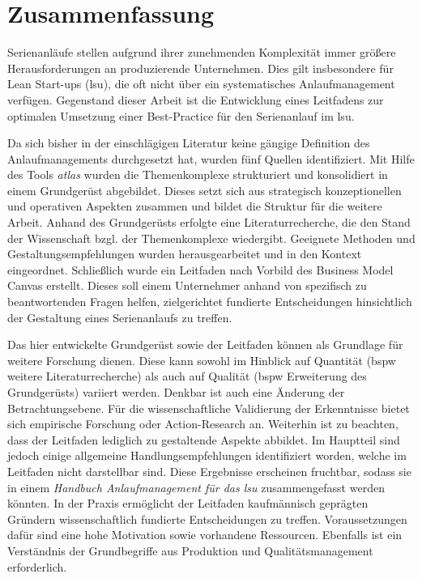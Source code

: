 \chapter*{Zusammenfassung}
Serienanläufe stellen aufgrund ihrer zunehmenden Komplexität immer größere Herausforderungen an produzierende Unternehmen. Dies gilt insbesondere für Lean Start-ups (\gls{lsu}), die oft nicht über ein systematisches Anlaufmanagement verfügen.
Gegenstand dieser Arbeit ist die Entwicklung eines Leitfadens zur optimalen Umsetzung einer Best-Practice für den Serienanlauf im \gls{lsu}.

Da sich bisher in der einschlägigen Literatur keine gängige Definition des Anlaufmanagements durchgesetzt hat, wurden fünf Quellen identifiziert. 
% 
Mit Hilfe des Tools \textit{\gls{atlas}} wurden die Themenkomplexe strukturiert und konsolidiert in einem Grundgerüst abgebildet. Dieses setzt sich aus strategisch konzeptionellen und operativen Aspekten zusammen und bildet die Struktur für die weitere Arbeit. 
Anhand des Grundgerüsts erfolgte eine Literaturrecherche, die den Stand der Wissenschaft bzgl. der Themenkomplexe wiedergibt. Geeignete Methoden und Gestaltungsempfehlungen wurden herausgearbeitet und in den Kontext eingeordnet. 
Schließlich wurde ein Leitfaden nach Vorbild des Business Model Canvas erstellt. Dieses soll einem Unternehmer anhand von spezifisch zu beantwortenden Fragen helfen, zielgerichtet fundierte Entscheidungen hinsichtlich der Gestaltung eines Serienanlaufs zu treffen. 
% 

Das hier entwickelte Grundgerüst sowie der Leitfaden können als Grundlage für weitere Forschung dienen. Diese kann sowohl im Hinblick auf Quantität (\gls{bspw} weitere Literaturrecherche) als auch auf Qualität (\gls{bspw} Erweiterung des Grundgerüsts) variiert werden. Denkbar ist auch eine Änderung der Betrachtungsebene. Für die wissenschaftliche Validierung der Erkenntnisse bietet sich empirische Forschung oder Action-Research an. 
Weiterhin ist zu beachten, dass der Leitfaden lediglich zu gestaltende Aspekte abbildet. Im Hauptteil sind jedoch einige allgemeine Handlungsempfehlungen identifiziert worden, welche im Leitfaden nicht darstellbar sind. Diese Ergebnisse erscheinen fruchtbar, sodass sie in einem \textit{Handbuch Anlaufmanagement für das \gls{lsu}} zusammengefasst werden könnten.
% 
In der Praxis ermöglicht der Leitfaden kaufmännisch geprägten Gründern wissenschaftlich fundierte Entscheidungen zu treffen. Voraussetzungen dafür sind eine hohe Motivation sowie vorhandene Ressourcen. Ebenfalls ist ein Verständnis der Grundbegriffe aus Produktion und Qualitätsmanagement erforderlich. 

